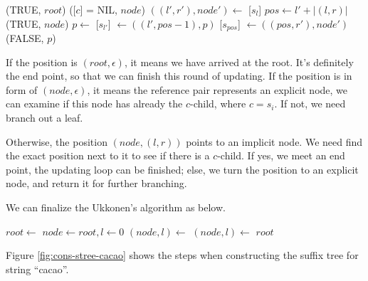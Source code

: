 \documentclass{article}
\begin{document}
\begin{algorithmic}
      \State \Return (TRUE, $root$)
    \Else
      \State \Return ([$c$] = NIL, $node$)
    \EndIf
  \Else
    \State $((l', r'), node') \gets$ [$s_l$]
    \State $pos \gets l' + |(l, r)|$
      \State \Return (TRUE, $node$)
    \Else
      \State $p \gets$ 
      \State {}[$s_{l'}$] $\gets ((l', pos-1), p)$
      \State {}[$s_{pos}$] $\gets ((pos, r'), node')$
      \State \Return (FALSE, $p$)
    \EndIf
  \EndIf
\EndFunction
\end{algorithmic}

If the position is $(root, \epsilon)$, it means we have arrived at the root.
It's definitely the end point, so that we can finish this round of updating.
If the position is in form of $(node, \epsilon)$, it means the reference pair represents
an explicit node, we can examine if this node has already the $c$-child, where $c=s_i$.
If not, we need branch out a leaf.

Otherwise, the position $(node, (l, r))$ points to an implicit node.
We need find the exact position next to it to see if there is a $c$-child.
If yes, we meet an end point, the updating loop can be finished; else, we turn
the position to an explicit node, and return it for further branching.

We can finalize the Ukkonen's algorithm as below.

\begin{algorithmic}[1]
  \State $root \gets$ 
  \State $node \gets root, l \gets 0$
    \State $(node, l) \gets $ 
    \State $(node, l) \gets $ 
  \EndFor
  \State \Return $root$
\EndFunction
\end{algorithmic}

Figure \ref{fig:cons-stree-cacao} shows the steps when constructing the
suffix tree for string ``cacao''.
\end{document}

